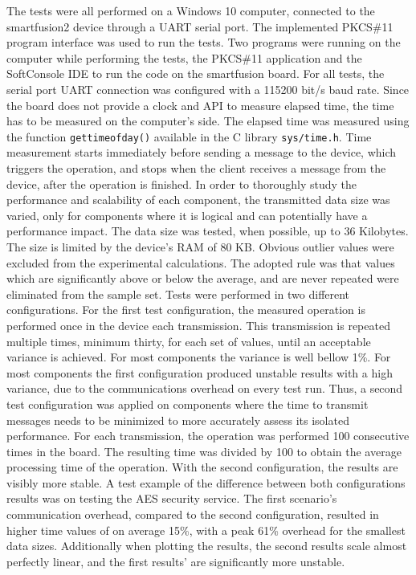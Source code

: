 The tests were all performed on a Windows 10 computer, connected to the smartfusion2 device through a \ac{UART} serial port. The implemented PKCS\#11 program interface was used to run the tests.
Two programs were running on the computer while performing the tests, the PKCS\#11 application and the SoftConsole \ac{IDE} to run the code on the smartfusion board.
For all tests, the serial port UART connection was configured with a 115200 bit/s baud rate.%
Since the board does not provide a clock and \ac{API} to measure elapsed time, the time has to be measured on the computer's side.
The elapsed time was measured using the function \texttt{gettimeofday()} available in the C library \texttt{sys/time.h}.
Time measurement starts immediately before sending a message to the device, which triggers the operation, and stops when the client receives a message from the device, after the operation is finished.
In order to thoroughly study the performance and scalability of each component, the transmitted data size was varied, only for components where it is logical and can potentially have a performance impact. The data size was tested, when possible, up to 36 Kilobytes. The size is limited by the device's \ac{RAM} of 80 KB.
Obvious outlier values were excluded from the experimental calculations. The adopted rule was that values which are significantly above or below the average, and are never repeated were eliminated from the sample set.
Tests were performed in two different configurations.
For the first test configuration, the measured operation is performed once in the device each transmission. This transmission is repeated multiple times, minimum thirty, for each set of values, until an acceptable variance is achieved. For most components the variance is well bellow 1\%.
For most components the first configuration produced unstable results with a high variance, due to the communications overhead on every test run.
Thus, a second test configuration was applied on components where the time to transmit messages needs to be minimized to more accurately assess its isolated performance. For each transmission, the operation was performed 100 consecutive times in the board. The resulting time was divided by 100 to obtain the average processing time of the operation.
With the second configuration, the results are visibly more stable.
A test example of the difference between both configurations results was on testing the \ac{AES} security service. The first scenario's communication overhead, compared to the second configuration, resulted in higher time values of on average 15\%, with a peak 61\% overhead for the smallest data sizes. Additionally when plotting the results, the second results scale almost perfectly linear, and the first results' are significantly more unstable.

